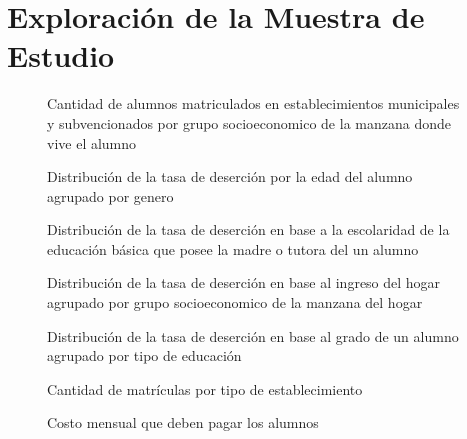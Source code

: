 \section{Exploración de la Muestra de Estudio}
\label{an:explod}

\begin{figure}[H]
  \centering
      \caption{Cantidad de alumnos matriculados en establecimientos municipales y subvencionados por grupo socioeconomico de la manzana donde vive el alumno}
    \label{fig:came}
\end{figure}

\begin{figure}[H]
  \centering
      \caption{Distribución de la tasa de deserción por la edad del alumno agrupado por genero}
    \label{fig:tdea}
\end{figure}

\begin{figure}[H]
  \centering
      \caption{Distribución de la tasa de deserción en base a la escolaridad de la educación básica que posee la madre o tutora del un alumno}
    \label{fig:tdm}
\end{figure}

\begin{figure}[H]
  \centering
      \caption{Distribución de la tasa de deserción en base al ingreso del hogar agrupado por grupo socioeconomico de la manzana del hogar}
    \label{fig:tdih}
\end{figure}

\begin{figure}[H]
  \centering
      \caption{Distribución de la tasa de deserción en base al grado de un alumno agrupado por tipo de educación}
    \label{fig:tdg}
\end{figure}

\begin{figure}[H]
  \centering
      \caption{Cantidad de matrículas por tipo de establecimiento}
    \label{fig:cme}
\end{figure}

\begin{figure}[H]
  \centering
      \caption{Costo mensual que deben pagar los alumnos}
    \label{fig:cma}
\end{figure}